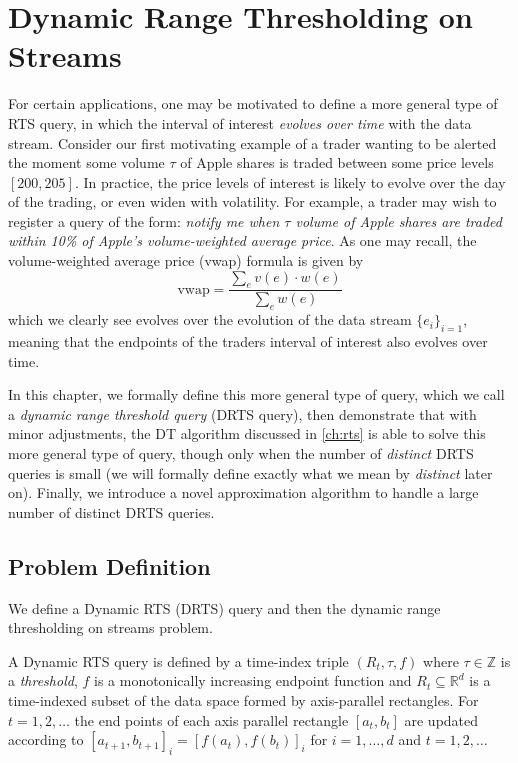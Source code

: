 \clearpage

\def\chaptertitle{Dynamic Range Thresholding on Streams}

\lhead{\emph{\chaptertitle}}

\chapter{\chaptertitle}
\label{ch:drts}

For certain applications, one may be motivated to define a more general type of RTS query, in which the interval of interest \textit{evolves over time} with the data stream. Consider our first motivating example of a trader wanting to be alerted the moment some volume $\tau$ of Apple shares is traded between some price levels $[200, 205]$. In practice, the price levels of interest is likely to evolve over the day of the trading, or even widen with volatility. For example, a trader may wish to register a query of the form: \textit{notify me when $\tau$ volume of Apple shares are traded within 10\% of Apple's volume-weighted average price}. As one may recall, the volume-weighted average price (vwap) formula is given by 
$$\text{vwap} = \frac{\sum_{e} v(e) \cdot w(e)}{\sum_{e}w(e)}$$
which we clearly see evolves over the evolution of the data stream $\{e_i\}_{i=1}$, meaning that the endpoints of the traders interval of interest also evolves over time.

In this chapter, we formally define this more general type of query, which we call a \textit{dynamic range threshold query} (DRTS query), then demonstrate that with minor adjustments, the DT algorithm discussed in \cref{ch:rts} is able to solve this more general type of query, though only when the number of \textit{distinct} DRTS queries is small (we will formally define exactly what we mean by \textit{distinct} later on). Finally, we introduce a novel approximation algorithm to handle a large number of distinct DRTS queries. 


\section{Problem Definition}
\label{sec:drts-problem-definition}

We define a Dynamic RTS (DRTS) query and then the dynamic range thresholding on streams problem.

\begin{definition} A Dynamic RTS query is defined by a time-index triple $(R_t, \tau, f)$ where $\tau\in\mathbb{Z}$ is a \textit{threshold}, $f$ is a monotonically increasing  endpoint function and $R_t\subseteq \mathbb{R}^d$ is a time-indexed subset of the data space formed by axis-parallel rectangles. For $t =1,2,\dots$ the end points of each axis parallel rectangle $[a_t, b_t]$ are updated according to $[a_{t+1}, b_{t+1}]_i = [f(a_t), f(b_t)]_i$ for $i=1,\dots,d$ and $t=1,2,\dots$
\end{definition}

